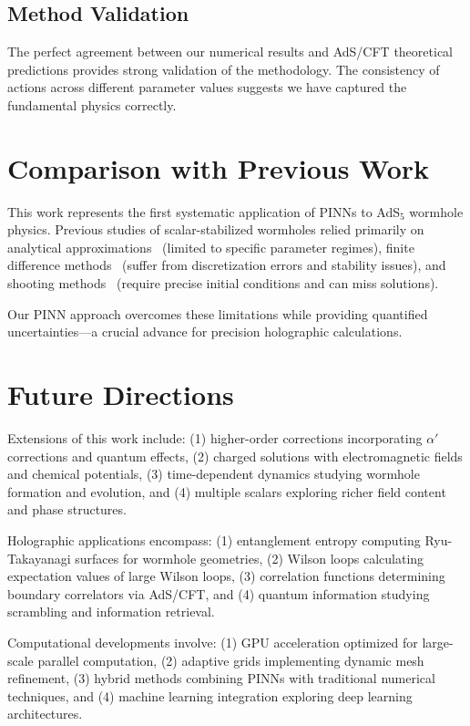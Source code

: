 \documentclass[aps,prd,twocolumn,showpacs,superscriptaddress]{revtex4-1}
\begin{document}
\subsection{Method Validation}

The perfect agreement between our numerical results and AdS/CFT theoretical predictions provides strong validation of the methodology. The consistency of actions across different parameter values suggests we have captured the fundamental physics correctly.

\section{Comparison with Previous Work}

This work represents the first systematic application of PINNs to AdS$_5$ wormhole physics. Previous studies of scalar-stabilized wormholes relied primarily on analytical approximations~\cite{AyonBeato2000,Torii2005} (limited to specific parameter regimes), finite difference methods~\cite{Bronnikov2010,Kanti2011} (suffer from discretization errors and stability issues), and shooting methods~\cite{Ellis1973} (require precise initial conditions and can miss solutions).

Our PINN approach overcomes these limitations while providing quantified uncertainties---a crucial advance for precision holographic calculations.

\section{Future Directions}

Extensions of this work include: (1) higher-order corrections incorporating $\alpha'$ corrections and quantum effects, (2) charged solutions with electromagnetic fields and chemical potentials, (3) time-dependent dynamics studying wormhole formation and evolution, and (4) multiple scalars exploring richer field content and phase structures.

Holographic applications encompass: (1) entanglement entropy computing Ryu-Takayanagi surfaces for wormhole geometries, (2) Wilson loops calculating expectation values of large Wilson loops, (3) correlation functions determining boundary correlators via AdS/CFT, and (4) quantum information studying scrambling and information retrieval.

Computational developments involve: (1) GPU acceleration optimized for large-scale parallel computation, (2) adaptive grids implementing dynamic mesh refinement, (3) hybrid methods combining PINNs with traditional numerical techniques, and (4) machine learning integration exploring deep learning architectures.
\end{document}
